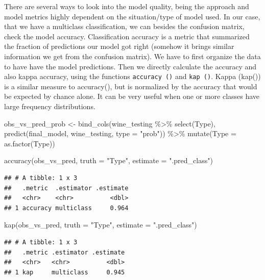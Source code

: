 \documentclass[
]{krantz}
\makeatletter
\newenvironment{Shaded}{\begin{snugshade}}{\end{snugshade}}
\newcommand{\AttributeTok}[1]{\textcolor[rgb]{0.61,0.61,0.61}{#1}}
\newcommand{\FunctionTok}[1]{\textcolor[rgb]{0,0,0}{#1}}
\newcommand{\NormalTok}[1]{#1}
\newcommand{\OtherTok}[1]{\textcolor[rgb]{0.37,0.37,0.37}{#1}}
\newcommand{\SpecialCharTok}[1]{\textcolor[rgb]{0,0,0}{#1}}
\newcommand{\StringTok}[1]{\textcolor[rgb]{0.5,0.5,0.5}{#1}}
\newenvironment{kframe}{%
\medskip{}
\setlength{\fboxsep}{.8em}
 \def\at@end@of@kframe{}%
 \ifinner\ifhmode%
  \def\at@end@of@kframe{\end{minipage}}%
  \begin{minipage}{\columnwidth}%
 \fi\fi%
 \def\FrameCommand##1{\hskip\@totalleftmargin \hskip-\fboxsep
 \colorbox{shadecolor}{##1}\hskip-\fboxsep
     \hskip-\linewidth \hskip-\@totalleftmargin \hskip\columnwidth}%
 \MakeFramed {\advance\hsize-\width
   \@totalleftmargin\z@ \linewidth\hsize
   \@setminipage}}%
 {\par\unskip\endMakeFramed%
 \at@end@of@kframe}
\renewenvironment{Shaded}{\begin{kframe}}{\end{kframe}}
\makeatother
\begin{document}
There are several ways to look into the model quality, being the approach and model metrics highly dependent on the situation/type of model used. In our case, that we have a multiclass classification, we can besides the confusion matrix, check the model accuracy. Classification accuracy is a metric that summarized the fraction of predictions our model got right (somehow it brings similar information we get from the confusion matrix). We have to first organize the data to have have the model predictions. Then we directly calculate the accuracy and also kappa accuracy, using the functions \texttt{accuracy\ ()} and \texttt{kap\ ()}. Kappa (kap()) is a similar measure to accuracy(), but is normalized by the accuracy that would be expected by chance alone. It can be very useful when one or more classes have large frequency distributions.

\begin{Shaded}
\begin{Highlighting}[]
\NormalTok{obs\_vs\_pred\_prob }\OtherTok{\textless{}{-}} \FunctionTok{bind\_cols}\NormalTok{(wine\_testing }\SpecialCharTok{\%\textgreater{}\%} \FunctionTok{select}\NormalTok{(Type), }\FunctionTok{predict}\NormalTok{(final\_model, wine\_testing, }\AttributeTok{type =} \StringTok{"prob"}\NormalTok{)) }\SpecialCharTok{\%\textgreater{}\%} 
  \FunctionTok{mutate}\NormalTok{(}\AttributeTok{Type =} \FunctionTok{as.factor}\NormalTok{(Type))}

\FunctionTok{accuracy}\NormalTok{(obs\_vs\_pred, }\AttributeTok{truth =} \StringTok{"Type"}\NormalTok{, }\AttributeTok{estimate =} \StringTok{".pred\_class"}\NormalTok{)}
\end{Highlighting}
\end{Shaded}

\begin{verbatim}
## # A tibble: 1 x 3
##   .metric  .estimator .estimate
##   <chr>    <chr>          <dbl>
## 1 accuracy multiclass     0.964
\end{verbatim}

\begin{Shaded}
\begin{Highlighting}[]
\FunctionTok{kap}\NormalTok{(obs\_vs\_pred, }\AttributeTok{truth =} \StringTok{"Type"}\NormalTok{, }\AttributeTok{estimate =} \StringTok{".pred\_class"}\NormalTok{)}
\end{Highlighting}
\end{Shaded}

\begin{verbatim}
## # A tibble: 1 x 3
##   .metric .estimator .estimate
##   <chr>   <chr>          <dbl>
## 1 kap     multiclass     0.945
\end{verbatim}
\end{document}
